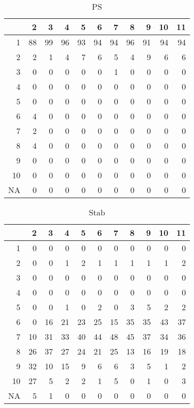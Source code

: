 \documentclass[11pt]{article}
\begin{document}
\begin{table}[H]
\centering
\begin{tabular}{rrrrrrrrrrr}
  \hline
 & 2 & 3 & 4 & 5 & 6 & 7 & 8 & 9 & 10 & 11 \\ 
  \hline
1 & 88 & 99 & 96 & 93 & 94 & 94 & 96 & 91 & 94 & 94 \\ 
  2 & 2 & 1 & 4 & 7 & 6 & 5 & 4 & 9 & 6 & 6 \\ 
  3 & 0 & 0 & 0 & 0 & 0 & 1 & 0 & 0 & 0 & 0 \\ 
  4 & 0 & 0 & 0 & 0 & 0 & 0 & 0 & 0 & 0 & 0 \\ 
  5 & 0 & 0 & 0 & 0 & 0 & 0 & 0 & 0 & 0 & 0 \\ 
  6 & 4 & 0 & 0 & 0 & 0 & 0 & 0 & 0 & 0 & 0 \\ 
  7 & 2 & 0 & 0 & 0 & 0 & 0 & 0 & 0 & 0 & 0 \\ 
  8 & 4 & 0 & 0 & 0 & 0 & 0 & 0 & 0 & 0 & 0 \\ 
  9 & 0 & 0 & 0 & 0 & 0 & 0 & 0 & 0 & 0 & 0 \\ 
  10 & 0 & 0 & 0 & 0 & 0 & 0 & 0 & 0 & 0 & 0 \\ 
  NA & 0 & 0 & 0 & 0 & 0 & 0 & 0 & 0 & 0 & 0 \\ 
   \hline
\end{tabular}
\caption{PS} 
\end{table}
\begin{table}[H]
\centering
\begin{tabular}{rrrrrrrrrrr}
  \hline
 & 2 & 3 & 4 & 5 & 6 & 7 & 8 & 9 & 10 & 11 \\ 
  \hline
1 & 0 & 0 & 0 & 0 & 0 & 0 & 0 & 0 & 0 & 0 \\ 
  2 & 0 & 0 & 1 & 2 & 1 & 1 & 1 & 1 & 1 & 2 \\ 
  3 & 0 & 0 & 0 & 0 & 0 & 0 & 0 & 0 & 0 & 0 \\ 
  4 & 0 & 0 & 0 & 0 & 0 & 0 & 0 & 0 & 0 & 0 \\ 
  5 & 0 & 0 & 1 & 0 & 2 & 0 & 3 & 5 & 2 & 2 \\ 
  6 & 0 & 16 & 21 & 23 & 25 & 15 & 35 & 35 & 43 & 37 \\ 
  7 & 10 & 31 & 33 & 40 & 44 & 48 & 45 & 37 & 34 & 36 \\ 
  8 & 26 & 37 & 27 & 24 & 21 & 25 & 13 & 16 & 19 & 18 \\ 
  9 & 32 & 10 & 15 & 9 & 6 & 6 & 3 & 5 & 1 & 2 \\ 
  10 & 27 & 5 & 2 & 2 & 1 & 5 & 0 & 1 & 0 & 3 \\ 
  NA & 5 & 1 & 0 & 0 & 0 & 0 & 0 & 0 & 0 & 0 \\ 
   \hline
\end{tabular}
\caption{Stab} 
\end{table}
\end{document}
